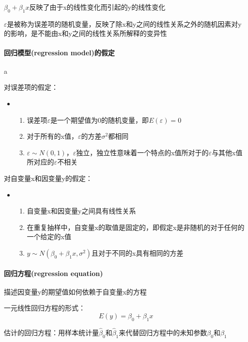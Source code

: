 \documentclass[UTF8,10pt]{book}
\begin{document}
$\beta_0 + \beta_1 x$反映了由于x的线性变化而引起的y的线性变化 

$\varepsilon$是被称为误差项的随机变量，反映了除x和y之间的线性关系之外的随机因素对y的影响，是不能由x和y之间的线性关系所解释的变异性

\paragraph{回归模型(regression model)的假定	}a

对误差项的假定：


\begin{itemize}
	\item [] {
		\begin{enumerate}
			\item 误差项$\varepsilon$是一个期望值为0的随机变量，即$E(\varepsilon)=0$
			\item 对于所有的x值，$\varepsilon$的方差$\sigma^2$都相同
			\item $\varepsilon \sim N(0,1) $，$\varepsilon$独立，独立性意味着一个特点的x值所对于的$\varepsilon$与其他x值所对应的$\varepsilon$不相关 
			
		\end{enumerate}
	}
\end{itemize}

对自变量x和因变量y的假定：





\begin{itemize}
	\item [] {
		\begin{enumerate}
			\item 自变量x和因变量y之间具有线性关系
			\item 在重复抽样中，自变量x的取值是固定的，即假定x是非随机的对于任何的一个给定的x值			
			\item $y \sim N(\beta_0 + \beta_1 x ,\sigma^2) $且对于不同的x具有相同的方差
			
		\end{enumerate}
	}
\end{itemize}

\paragraph{回归方程(regression equation)	}
描述因变量y的期望值如何依赖于自变量x的方程 

一元线性回归方程的形式： 
$$E(y) = \beta_0 + \beta_1 x $$ 

估计的回归方程：用样本统计量$\hat{\beta}_0$和$\hat{\beta}_1$来代替回归方程中的未知参数$\beta_0$和$\beta_1$ 
\end{document}
